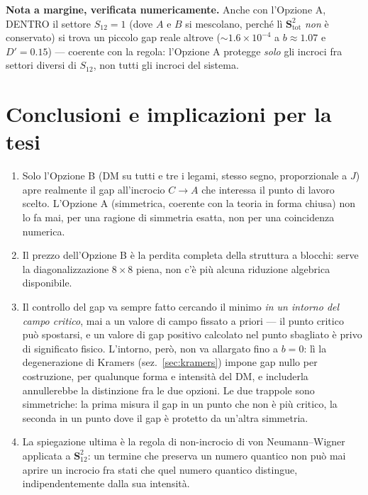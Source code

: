 \documentclass[11pt,a4paper]{article}
\theoremstyle{remark}
\begin{document}
\textbf{Nota a margine, verificata numericamente.} Anche con l'Opzione A, DENTRO il
settore $S_{12}=1$ (dove $A$ e $B$ si mescolano, perché lì $\mathbf S^2_\text{tot}$
\emph{non} è conservato) si trova un piccolo gap reale altrove
($\sim1.6\times10^{-4}$ a $b\approx1.07$ e $D'=0.15$) — coerente con la regola:
l'Opzione A protegge \emph{solo} gli incroci fra settori diversi di $S_{12}$, non
tutti gli incroci del sistema.

\section{Conclusioni e implicazioni per la tesi}

\begin{enumerate}[leftmargin=1.4em]
\item Solo l'Opzione B (DM su tutti e tre i legami, stesso segno, proporzionale a $J$)
apre realmente il gap all'incrocio $C\to A$ che interessa il punto di lavoro scelto.
L'Opzione A (simmetrica, coerente con la teoria in forma chiusa) non lo fa mai, per
una ragione di simmetria esatta, non per una coincidenza numerica.
\item Il prezzo dell'Opzione B è la perdita completa della struttura a blocchi:
serve la diagonalizzazione $8\times8$ piena, non c'è più alcuna riduzione algebrica
disponibile.
\item Il controllo del gap va sempre fatto cercando il minimo \emph{in un intorno
del campo critico}, mai a un valore di campo fissato a priori — il punto critico può
spostarsi, e un valore di gap positivo calcolato nel punto sbagliato è privo di
significato fisico. L'intorno, però, non va allargato fino a $b=0$: lì la
degenerazione di Kramers (sez.~\ref{sec:kramers}) impone gap nullo per costruzione,
per qualunque forma e intensità del DM, e includerla annullerebbe la distinzione fra
le due opzioni. Le due trappole sono simmetriche: la prima misura il gap in un punto
che non è più critico, la seconda in un punto dove il gap è protetto da un'altra
simmetria.
\item La spiegazione ultima è la regola di non-incrocio di von Neumann--Wigner
applicata a $\mathbf S_{12}^2$: un termine che preserva un numero quantico non può mai
aprire un incrocio fra stati che quel numero quantico distingue, indipendentemente
dalla sua intensità.
\end{enumerate}
\end{document}
